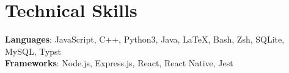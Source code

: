 \documentclass[letterpaper,9pt]{article} %
\begin{document}
\section{Technical Skills}
\vspace{5pt}
 \begin{itemize}[leftmargin=0.15in, label={}]
    \small{\item{
     \textbf{Languages}{: JavaScript, C++, Python3, Java, \LaTeX, Bash, Zsh, SQLite, MySQL, Typst} \\
     \textbf{Frameworks}{: Node.js, Express.js, React, React Native, Jest}
    }}
 \end{itemize}
\end{document}
